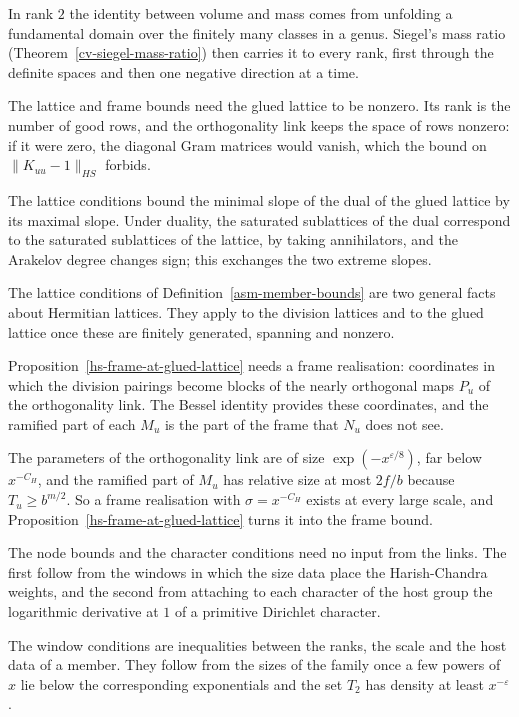 In rank $2$ the identity between volume and mass comes from unfolding a
fundamental domain over the finitely many classes in a genus. Siegel's mass
ratio (Theorem~\ref{cv-siegel-mass-ratio}) then carries it to every rank,
first through the definite spaces and then one negative direction at a time.

The lattice and frame bounds need the glued lattice to be nonzero. Its rank is
the number of good rows, and the orthogonality link keeps the space of rows
nonzero: if it were zero, the diagonal Gram matrices would vanish, which the
bound on $\|K_{uu}-1\|_{HS}$ forbids.

The lattice conditions bound the minimal slope of the dual of the glued lattice
by its maximal slope. Under duality, the saturated sublattices of the dual
correspond to the saturated sublattices of the lattice, by taking annihilators,
and the Arakelov degree changes sign; this exchanges the two extreme slopes.

The lattice conditions of Definition~\ref{asm-member-bounds} are two general
facts about Hermitian lattices. They apply to the division lattices and to the
glued lattice once these are finitely generated, spanning and nonzero.

Proposition~\ref{hs-frame-at-glued-lattice} needs a frame realisation:
coordinates in which the division pairings become blocks of the nearly
orthogonal maps $P_u$ of the orthogonality link. The Bessel identity provides
these coordinates, and the ramified part of each $M_u$ is the part of the frame
that $N_u$ does not see.

The parameters of the orthogonality link are of size $\exp(-x^{\varepsilon/8})$,
far below $x^{-C_H}$, and the ramified part of $M_u$ has relative size at most
$2f/b$ because $T_u\ge b^{m/2}$. So a frame realisation with $\sigma=x^{-C_H}$
exists at every large scale, and Proposition~\ref{hs-frame-at-glued-lattice}
turns it into the frame bound.

The node bounds and the character conditions need no input from the links. The
first follow from the windows in which the size data place the Harish-Chandra
weights, and the second from attaching to each character of the host group the
logarithmic derivative at $1$ of a primitive Dirichlet character.

The window conditions are inequalities between the ranks, the scale and the
host data of a member. They follow from the sizes of the family once a few
powers of $x$ lie below the corresponding exponentials and the set $T_2$ has
density at least $x^{-\varepsilon}$.

